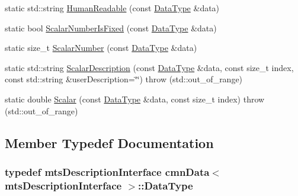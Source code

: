 \begin{DoxyCompactItemize}
\item 
static std\-::string \hyperlink{classcmn_data_3_01mts_description_interface_01_4_a5151940df49f8086d9d2ab5dbf8f10a7}{Human\-Readable} (const \hyperlink{classcmn_data_3_01mts_description_interface_01_4_a17b736179c710a2ad3b114ef631709bb}{Data\-Type} \&data)
\item 
static bool \hyperlink{classcmn_data_3_01mts_description_interface_01_4_a870e5e5955f45ee86aa378000f5b0aaf}{Scalar\-Number\-Is\-Fixed} (const \hyperlink{classcmn_data_3_01mts_description_interface_01_4_a17b736179c710a2ad3b114ef631709bb}{Data\-Type} \&data)
\item 
static size\-\_\-t \hyperlink{classcmn_data_3_01mts_description_interface_01_4_ad1fcb08e4a79af56049209c4316a5ddd}{Scalar\-Number} (const \hyperlink{classcmn_data_3_01mts_description_interface_01_4_a17b736179c710a2ad3b114ef631709bb}{Data\-Type} \&data)
\item 
static std\-::string \hyperlink{classcmn_data_3_01mts_description_interface_01_4_a3c6aef8af389e8178e5cbf121776b3ed}{Scalar\-Description} (const \hyperlink{classcmn_data_3_01mts_description_interface_01_4_a17b736179c710a2ad3b114ef631709bb}{Data\-Type} \&data, const size\-\_\-t index, const std\-::string \&user\-Description=\char`\"{}\char`\"{})  throw (std\-::out\-\_\-of\-\_\-range)
\item 
static double \hyperlink{classcmn_data_3_01mts_description_interface_01_4_a77ef3b918c7b9fc9891c9f26de848cec}{Scalar} (const \hyperlink{classcmn_data_3_01mts_description_interface_01_4_a17b736179c710a2ad3b114ef631709bb}{Data\-Type} \&data, const size\-\_\-t index)  throw (std\-::out\-\_\-of\-\_\-range)
\end{DoxyCompactItemize}


\subsection{Member Typedef Documentation}
\hypertarget{classcmn_data_3_01mts_description_interface_01_4_a17b736179c710a2ad3b114ef631709bb}{
\subsubsection[{Data\-Type}]{\setlength{\rightskip}{0pt plus 5cm}typedef {\bf mts\-Description\-Interface} {\bf cmn\-Data}$<$ {\bf mts\-Description\-Interface} $>$\-::{\bf Data\-Type}}}\label{classcmn_data_3_01mts_description_interface_01_4_a17b736179c710a2ad3b114ef631709bb}


